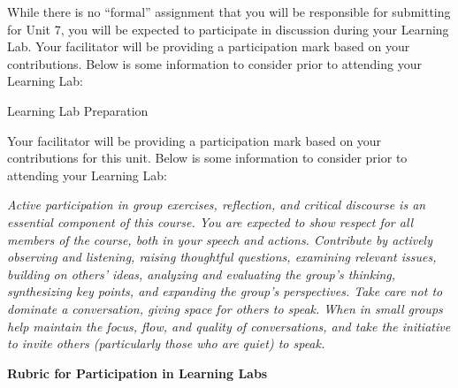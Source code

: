 \documentclass[
]{book}
\begin{document}
\begin{assessment}
While there is no ``formal'' assignment that you will be responsible for submitting for Unit 7, you will be expected to participate in discussion during your Learning Lab. Your facilitator will be providing a participation mark based on your contributions. Below is some information to consider prior to attending your Learning Lab:

{Learning Lab Preparation}

Your facilitator will be providing a participation mark based on your contributions for this unit. Below is some information to consider prior to attending your Learning Lab:

\emph{Active participation in group exercises, reflection, and critical discourse is an essential component of this course. You are expected to show respect for all members of the course, both in your speech and actions. Contribute by actively observing and listening, raising thoughtful questions, examining relevant issues, building on others' ideas, analyzing and evaluating the group's thinking, synthesizing key points, and expanding the group's perspectives. Take care not to dominate a conversation, giving space for others to speak. When in small groups help maintain the focus, flow, and quality of conversations, and take the initiative to invite others (particularly those who are quiet) to speak.}

\textbf{Rubric for Participation in Learning Labs}


\end{assessment}
\end{document}
